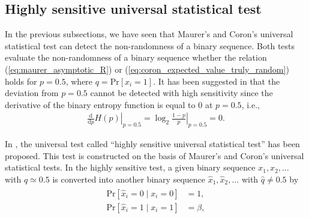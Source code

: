 \subsection{Highly sensitive universal statistical test}
In the previous subsections, we have seen that Maurer's and Coron's universal statistical test can detect the non-randomness of a binary sequence.
Both tests evaluate the non-randomness of a binary sequence whether the relation (\ref{eq:maurer_asymptotic_R}) or (\ref{eq:coron_expected_value_truly_random}) holds for $p=0.5$, where $q=\mathrm{Pr}[x_i=1]$. It has been suggested in \cite{yamamoto2016highly} that the deviation from $p=0.5$ cannot be detected with high sensitivity since the derivative of the binary entropy function is equal to $0$ at $p=0.5$, i.e.,
\begin{align}
  \left.\frac{\mathrm{d}}{\mathrm{d}p}H(p) \right|_{p=0.5} = \left.\log_2\frac{1-p}{p}\right|_{p=0.5} = 0.
\end{align}
\par
In \cite{yamamoto2016highly}, the universal test called ``highly sensitive universal statistical test'' has been proposed. This test is constructed on the basis of Maurer's and Coron's universal statistical tests.
%
In the highly sensitive test, a given binary sequence $x_1,x_2,\dots$ with $q \simeq 0.5$ is converted into another binary sequence $\hat{x}_1,\hat{x}_2,\dots$ with $\hat{q} \neq 0.5$ by
%
\begin{align}\label{eq:convert}
\begin{split}
  \mathrm{Pr}[\hat{x}_i = 0 \mid x_i=0] &= 1, \\
  \mathrm{Pr}[\hat{x}_i = 1 \mid x_i=1] &= \beta,
\end{split}
\end{align}
